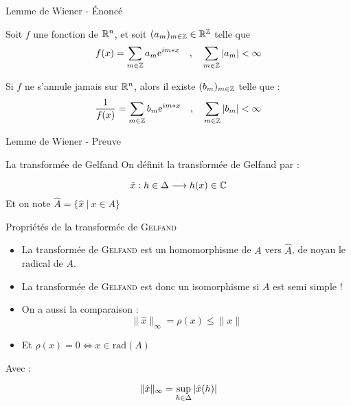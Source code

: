 \documentclass[11pt, xcolor=table]{beamer}
\begin{document}
\begin{frame}{Lemme de Wiener - Énoncé}
    \begin{myth}
        Soit $f$ une fonction de $\mathbb{R}^n$, et soit $(a_m)_{m \in \mathbb{Z}} \in \mathbb{R}^{\mathbb{Z}} $ telle que 
        \[
            f(x) = \sum_{m\in \mathbb{Z} } a_m \textrm{e}^{im*x} \quad \text{,} \quad \sum_{m \in \mathbb{Z} } | a_m | < \infty 
        \]

        Si $f$ ne s'annule jamais sur $\mathbb{R}^n$, alors il existe $(b_m)_{m \in \mathbb{Z}} $ telle que :
        \[
            \frac{1}{f(x)} = \sum_{m \in \mathbb{Z}} b_m \textrm{e}^{im*x} \quad \text{,} \quad \sum_{m \in \mathbb{Z} } | b_m | < \infty 
        \]
    \end{myth}
\end{frame}

\begin{frame}{Lemme de Wiener - Preuve}

\end{frame}

\begin{frame}{La transformée de Gelfand}
    On définit la transformée de Gelfand par :
    \begin{mydef}
        \[
            \hat{x} : h \in \Delta \longrightarrow h(x) \in \mathbb{C} 
        \]
        Et on note $\hat{A} = \{ \hat{x} \ | \ x \in A \}$
    \end{mydef}
\end{frame}

\begin{frame}
    \begin{myth}{Propriétés de la transformée de \textsc{Gelfand}}
        \begin{itemize}
            \item La transformée de \textsc{Gelfand} est un homomorphisme de $A$ vers $\hat{A}$, de noyau le radical de $A$.
            \item La transformée de \textsc{Gelfand} est donc un isomorphisme si $A$ est semi simple !
                \item On a aussi la comparaison :
                    \[
                        \| \hat{x} \|_{\infty} = \rho(x) \leq \| x \|
                    \]
                \item Et $\rho(x) = 0 \iff x \in \mathrm{rad}(A) $
        \end{itemize}
        \end{myth}

        Avec :
        \begin{mydef}
            \[
                \| \hat{x} \|_{\infty} = \sup_{h \in \Delta } | \hat{x}(h) |
            \]
        \end{mydef}
\end{frame}
\end{document}
